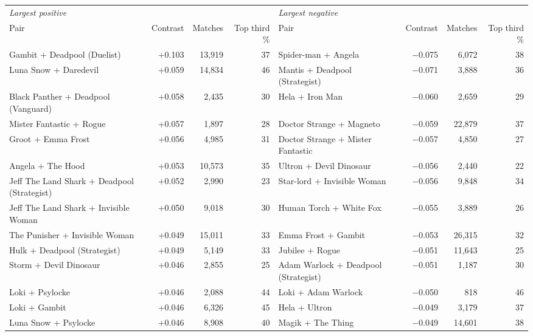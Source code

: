 \documentclass[11pt]{article}
\renewcommand{\arraystretch}{1.06}
\begin{document}
\begin{landscape}
\begin{center}
{\footnotesize\setlength{\tabcolsep}{3.5pt}\renewcommand{\arraystretch}{1.0}
\label{tab:nt}
\begin{tabular}{l r r r @{\hspace{2em}} l r r r}
\toprule
\multicolumn{4}{l}{\emph{Largest positive}} & \multicolumn{4}{l}{\emph{Largest negative}} \\
Pair & Contrast & Matches & Top third \% & Pair & Contrast & Matches & Top third \% \\
\midrule
Gambit + Deadpool (Duelist) & +0.103 & 13,919 & 37 & Spider-man + Angela & $-$0.075 & 6,072 & 38 \\
Luna Snow + Daredevil & +0.059 & 14,834 & 46 & Mantis + Deadpool (Strategist) & $-$0.071 & 3,888 & 36 \\
Black Panther + Deadpool (Vanguard) & +0.058 & 2,435 & 30 & Hela + Iron Man & $-$0.060 & 2,659 & 29 \\
Mister Fantastic + Rogue & +0.057 & 1,897 & 28 & Doctor Strange + Magneto & $-$0.059 & 22,879 & 37 \\
Groot + Emma Frost & +0.056 & 4,985 & 31 & Doctor Strange + Mister Fantastic & $-$0.057 & 4,850 & 27 \\
Angela + The Hood & +0.053 & 10,573 & 35 & Ultron + Devil Dinosaur & $-$0.056 & 2,440 & 22 \\
Jeff The Land Shark + Deadpool (Strategist) & +0.052 & 2,990 & 23 & Star-lord + Invisible Woman & $-$0.056 & 9,848 & 34 \\
Jeff The Land Shark + Invisible Woman & +0.050 & 9,018 & 30 & Human Torch + White Fox & $-$0.055 & 3,889 & 26 \\
The Punisher + Invisible Woman & +0.049 & 15,011 & 33 & Emma Frost + Gambit & $-$0.053 & 26,315 & 32 \\
Hulk + Deadpool (Strategist) & +0.049 & 5,149 & 33 & Jubilee + Rogue & $-$0.051 & 11,643 & 25 \\
Storm + Devil Dinosaur & +0.046 & 2,855 & 25 & Adam Warlock + Deadpool (Strategist) & $-$0.051 & 1,187 & 30 \\
Loki + Psylocke & +0.046 & 2,088 & 44 & Loki + Adam Warlock & $-$0.050 & 818 & 46 \\
Loki + Gambit & +0.046 & 6,326 & 45 & Hela + Ultron & $-$0.049 & 3,179 & 37 \\
Luna Snow + Psylocke & +0.046 & 8,908 & 40 & Magik + The Thing & $-$0.049 & 14,601 & 38 \\

\end{tabular}}
\end{center}
\end{landscape}
\end{document}
